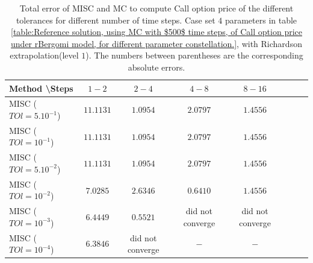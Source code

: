 \documentclass[11pt]{article}
\begin{document}
\begin{table}[h!]
	\centering
	\begin{tabular}{l*{6}{c}r}
		Method \textbackslash  Steps            & $1-2$ & $2-4$ & $4-8$ & $8-16$  \\
		\hline
		MISC ($TOl=5.10^{-1}$)  & $\mathbf{11.1131}$ & $\mathbf{1.0954}$ & $\mathbf{2.0797}$ & $\mathbf{1.4556}$ \\
		MISC ($TOl=10^{-1}$)  & $\mathbf{11.1131}$ & $\mathbf{1.0954}$ & $\mathbf{2.0797}$ & $\mathbf{1.4556}$  \\
		MISC ($TOl=5.10^{-2}$)  & $\mathbf{11.1131}$ & $\mathbf{1.0954}$ & $\mathbf{2.0797}$ & $\mathbf{1.4556}$  \\
		MISC ($TOl=10^{-2}$)  & $\mathbf{7.0285}$ & $\mathbf{2.6346}$ & $\mathbf{0.6410}$ & $\mathbf{1.4556}$  \\	
		MISC ($TOl=10^{-3}$)  & $\mathbf{6.4449}$ & $\mathbf{0.5521}$ & did not converge& did not converge  \\	
		MISC ($TOl=10^{-4}$)  & $\mathbf{6.3846}$ & did not converge & $\mathbf{-}$ & $\mathbf{-}$  \\	
		\hline
	\end{tabular}
	\caption{Total  error of MISC and MC to compute Call option price of the different tolerances for different number of time steps. Case set $4$ parameters in table \ref{table:Reference solution, using MC with $500$ time steps, of Call option price under rBergomi model, for different parameter constellation.}, with Richardson extrapolation(level $1$). The numbers between parentheses are the corresponding absolute errors.}
	\label{Total  error of MISC and MC to compute Call option price of the different tolerances for different number of time steps. Case set $4$ parameters, with Richardson extrapolation(level $1$). The numbers between parentheses are the corresponding absolute errors.}
\end{table}
\end{document}
